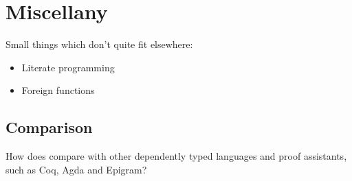 \section{Miscellany}

Small things which don't quite fit elsewhere:

\begin{itemize}
\item Literate programming
\item Foreign functions
\end{itemize}

\subsection{Comparison}

How does \Idris{} compare with other dependently typed languages and proof
assistants, such as Coq, Agda and Epigram?
